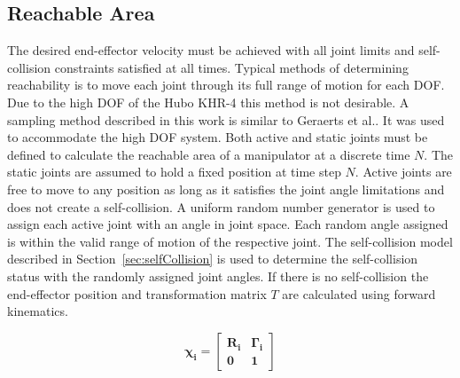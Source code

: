 \subsection{Reachable Area}\label{sec:rarea}
The desired end-effector velocity must be achieved with all joint limits and self-collision constraints satisfied at all times. Typical methods of determining reachability is to move each joint through its full range of motion for each DOF\cite{100034,springerlink:101007}. Due to the high DOF of the Hubo KHR-4 this method is not desirable.  A sampling method described in this work is similar to Geraerts et al.\cite{1570152}.  It was used to accommodate the high DOF system.
Both active and static joints must be defined to calculate the reachable area of a manipulator at a discrete time $N$.  The static joints are assumed to hold a fixed position at time step $N$.  Active joints are free to move to any position as long as it satisfies the joint angle limitations and does not create a self-collision.  A uniform random number generator is used to assign each active joint with an angle in joint space.  Each random angle assigned is within the valid range of motion of the respective joint.  The self-collision model described in Section~\ref{sec:selfCollision} is used to determine the self-collision status with the randomly assigned joint angles.  If there is no self-collision the end-effector position and transformation matrix $T$ are calculated using forward kinematics.

\begin{equation}\label{eq:fk1}
\mathbf{
\chi_i = \begin{bmatrix} R_{i} & \Gamma_{i} \\ 0 & 1 \end{bmatrix}
}
\end{equation}

